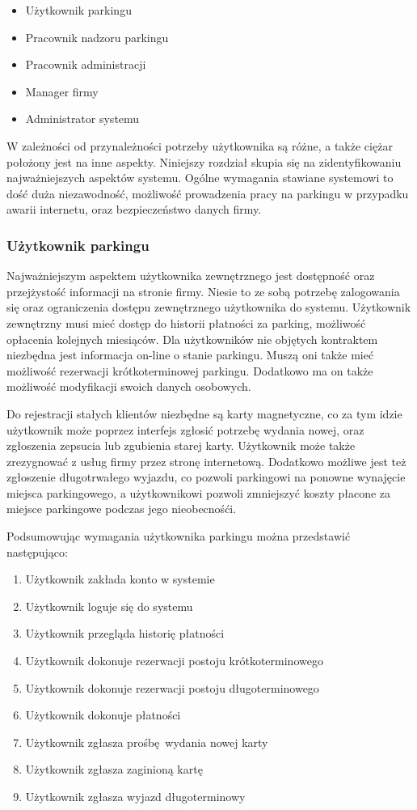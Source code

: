\documentclass[paper=a4, fontsize=11pt]{scrartcl} %
\begin{document}
\begin{itemize}
  \item Użytkownik parkingu
  \item Pracownik nadzoru parkingu
  \item Pracownik administracji
  \item Manager firmy
  \item Administrator systemu 
\end{itemize}

W zależności od przynależności potrzeby użytkownika są różne, a także ciężar położony jest na inne aspekty.
Niniejszy rozdział skupia się na zidentyfikowaniu najważniejszych aspektów systemu.
Ogólne wymagania stawiane systemowi to dość duża niezawodność, możliwość prowadzenia pracy na parkingu
w przypadku awarii internetu, oraz bezpieczeństwo danych firmy.

\subsubsection{Użytkownik parkingu}

Najważniejszym aspektem użytkownika zewnętrznego jest dostępność oraz przejżystość informacji na stronie firmy.
Niesie to ze sobą potrzebę zalogowania się oraz ograniczenia dostępu zewnętrznego użytkownika do systemu.
Użytkownik zewnętrzny musi mieć dostęp do historii płatności za parking, możliwość opłacenia kolejnych miesiąców.
Dla użytkowników nie objętych kontraktem niezbędna jest informacja on-line o stanie parkingu.
Muszą oni także mieć możliwość rezerwacji krótkoterminowej parkingu.
Dodatkowo ma on także możliwość modyfikacji swoich danych osobowych.

Do rejestracji stałych klientów niezbędne są karty magnetyczne, co za tym idzie użytkownik może poprzez interfejs zgłosić potrzebę wydania nowej, oraz zgłoszenia
zepsucia lub zgubienia starej karty. Użytkownik może także zrezygnować z usług firmy przez stronę internetową.
Dodatkowo możliwe jest też zgłoszenie długotrwałego wyjazdu, co pozwoli parkingowi na ponowne wynajęcie miejsca parkingowego,
a użytkownikowi pozwoli zmniejszyć koszty płacone za miejsce parkingowe podczas jego nieobecnośći.

Podsumowując wymagania użytkownika parkingu można przedstawić następująco:

\begin{enumerate}
  \item Użytkownik zakłada konto w systemie
  \item Użytkownik loguje się do systemu
  \item Użytkownik przegląda historię płatności
  \item Użytkownik dokonuje rezerwacji postoju krótkoterminowego
  \item Użytkownik dokonuje rezerwacji postoju długoterminowego
  \item Użytkownik dokonuje płatności
  \item Użytkownik zgłasza prośbę wydania nowej karty
  \item Użytkownik zgłasza zaginioną kartę
  \item Użytkownik zgłasza wyjazd długoterminowy
\end{enumerate}
\end{document}
